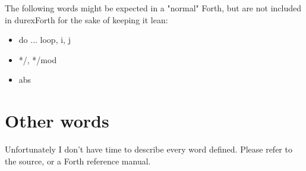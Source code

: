 The following words might be expected in a "normal" Forth, but are not included in durexForth for the sake of keeping it lean:

\begin{itemize}
\item do ... loop, i, j
\item */, */mod
\item abs
\end{itemize}


\section{Other words}

Unfortunately I don't have time to describe every word defined. Please refer to the source, or a Forth reference manual.
